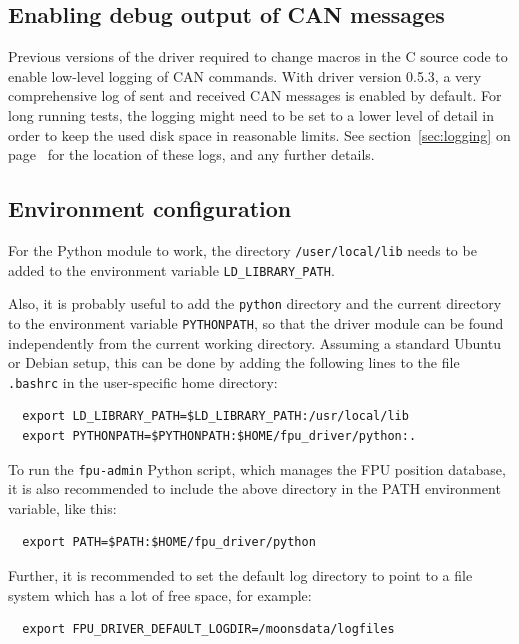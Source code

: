 \documentclass[11pt,a4paper]{scrartcl}
\begin{document}
\subsection{Enabling debug output of CAN messages}

Previous versions of the driver required to change macros in the C
source code to enable low-level logging of CAN commands.  With driver
version 0.5.3, a very comprehensive log of sent and received CAN
messages is enabled by default. For long running tests, the logging
might need to be set to a lower level of detail in order to keep the
used disk space in reasonable limits.  See section~\ref{sec:logging}
on page~\pageref{sec:logging} for the location of these logs, and any
further details.


\subsection{Environment configuration}

For the Python module to work, the directory \texttt{/user/local/lib}
needs to be added to the environment variable
\texttt{LD\_LIBRARY\_PATH}.

Also, it is probably useful to add the \texttt{python} directory and
the current directory to the environment variable \texttt{PYTHONPATH},
so that the driver module can be found independently from the current
working directory.  Assuming a standard Ubuntu or Debian setup, this
can be done by adding the following lines to the file \texttt{.bashrc}
in the user-specific home directory:

\begin{verbatim}
  export LD_LIBRARY_PATH=$LD_LIBRARY_PATH:/usr/local/lib
  export PYTHONPATH=$PYTHONPATH:$HOME/fpu_driver/python:.
\end{verbatim}

To run the \texttt{fpu-admin} Python script, which manages the FPU
position database, it is also recommended to include the above
directory in the PATH environment variable, like this:

\begin{verbatim}
  export PATH=$PATH:$HOME/fpu_driver/python
\end{verbatim}

 
Further, it is recommended to set the default log directory to point
to a file system which has a lot of free space, for example:
\begin{verbatim}
  export FPU_DRIVER_DEFAULT_LOGDIR=/moonsdata/logfiles
\end{verbatim}
\end{document}

